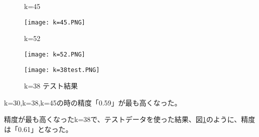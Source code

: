 \begin{itemize}
\begin{figure}[htbp]
\begin{minipage}[t]{0.22\hsize}
      \caption{k=45}
      \label{graph:16}
      \texttt{[image: k=45.PNG]}
    \end{minipage}
    \begin{minipage}[t]{0.22\hsize}
      \centering
      \caption{k=52}
      \label{graph:17}
      \texttt{[image: k=52.PNG]}
    \end{minipage}
    \begin{minipage}[t]{0.78\hsize}
      \centering
      \caption{k=38 テスト結果}
      \label{graph:18}
      \texttt{[image: k=38test.PNG]}
    \end{minipage}
  \end{figure}
  \LARGE{\item k=30,k=38,k=45の時の精度「0.59」が最も高くなった。
  \item 精度が最も高くなったk=38で、テストデータを使った結果、図\ref{graph:18}のように、精度は「0.61」となった。}
\end{itemize}
